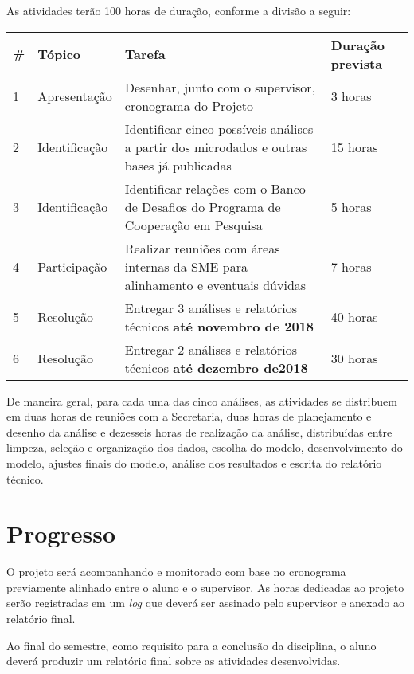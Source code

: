 \documentclass{article}
\begin{document}
As atividades terão 100 horas de duração, conforme a divisão a seguir:

\begin{center}
  \begin{tabular}{ | l | l | p{5cm} | l | }
    \hline
    \# & Tópico & Tarefa & Duração prevista \\ \hline
    1 & Apresentação & Desenhar, junto com o supervisor, cronograma do Projeto  & 3 horas \\ \hline
    2 & Identificação & Identificar cinco possíveis análises a partir dos microdados e outras bases já publicadas & 15 horas \\ \hline
    3 & Identificação & Identificar relações com o Banco de Desafios do Programa de Cooperação em Pesquisa & 5 horas \\ \hline
    4 & Participação & Realizar reuniões com áreas internas da SME para alinhamento e eventuais dúvidas & 7 horas \\ \hline
    5 & Resolução & Entregar 3 análises e relatórios técnicos \textbf{até novembro de 2018} & 40 horas  \\ \hline
    6 & Resolução & Entregar 2 análises e relatórios técnicos \textbf{até dezembro de2018} & 30 horas \\ \hline
 \end{tabular}
\end{center}

De maneira geral, para cada uma das cinco análises, as atividades se distribuem em duas horas de reuniões com a Secretaria, duas horas de planejamento e desenho da análise e dezesseis horas de realização da análise, distribuídas entre limpeza, seleção e organização dos dados, escolha do modelo, desenvolvimento do modelo, ajustes finais do modelo, análise dos resultados e escrita do relatório técnico. 

\section{Progresso}

O projeto será acompanhando e monitorado com base no cronograma previamente alinhado entre o aluno e o supervisor. As horas dedicadas ao projeto serão registradas em um \textit{log} que deverá ser assinado pelo supervisor e anexado ao relatório final.

Ao final do semestre, como requisito para a conclusão da disciplina, o aluno deverá produzir um relatório final sobre as atividades desenvolvidas.
\end{document}
